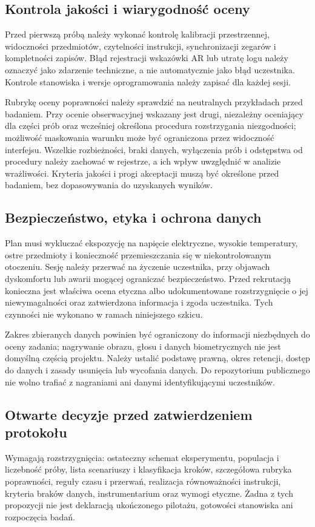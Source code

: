 \documentclass[11pt,a4paper]{article}
\begin{document}
\subsection{Kontrola jakości i wiarygodność oceny}
Przed pierwszą próbą należy wykonać kontrolę kalibracji przestrzennej, widoczności przedmiotów, czytelności instrukcji, synchronizacji zegarów i kompletności zapisów. Błąd rejestracji wskazówki AR lub utratę logu należy oznaczyć jako zdarzenie techniczne, a nie automatycznie jako błąd uczestnika. Kontrole stanowiska i wersje oprogramowania należy zapisać dla każdej sesji.

Rubrykę oceny poprawności należy sprawdzić na neutralnych przykładach przed badaniem. Przy ocenie obserwacyjnej wskazany jest drugi, niezależny oceniający dla części prób oraz wcześniej określona procedura rozstrzygania niezgodności; możliwość maskowania warunku może być ograniczona przez widoczność interfejsu. Wszelkie rozbieżności, braki danych, wyłączenia prób i odstępstwa od procedury należy zachować w rejestrze, a ich wpływ uwzględnić w analizie wrażliwości. Kryteria jakości i progi akceptacji muszą być określone przed badaniem, bez dopasowywania do uzyskanych wyników.

\subsection{Bezpieczeństwo, etyka i ochrona danych}
Plan musi wykluczać ekspozycję na napięcie elektryczne, wysokie temperatury, ostre przedmioty i konieczność przemieszczania się w niekontrolowanym otoczeniu. Sesję należy przerwać na życzenie uczestnika, przy objawach dyskomfortu lub awarii mogącej ograniczać bezpieczeństwo. Przed rekrutacją konieczna jest właściwa ocena etyczna albo udokumentowane rozstrzygnięcie o jej niewymagalności oraz zatwierdzona informacja i zgoda uczestnika. Tych czynności nie wykonano w ramach niniejszego szkicu.

Zakres zbieranych danych powinien być ograniczony do informacji niezbędnych do oceny zadania; nagrywanie obrazu, głosu i danych biometrycznych nie jest domyślną częścią projektu. Należy ustalić podstawę prawną, okres retencji, dostęp do danych i zasady usunięcia lub wycofania danych. Do repozytorium publicznego nie wolno trafiać z nagraniami ani danymi identyfikującymi uczestników.

\subsection{Otwarte decyzje przed zatwierdzeniem protokołu}
Wymagają rozstrzygnięcia: ostateczny schemat eksperymentu, populacja i liczebność próby, lista scenariuszy i klasyfikacja kroków, szczegółowa rubryka poprawności, reguły czasu i przerwań, realizacja równoważności instrukcji, kryteria braków danych, instrumentarium oraz wymogi etyczne. Żadna z tych propozycji nie jest deklaracją ukończonego pilotażu, gotowości stanowiska ani rozpoczęcia badań.
\end{document}
